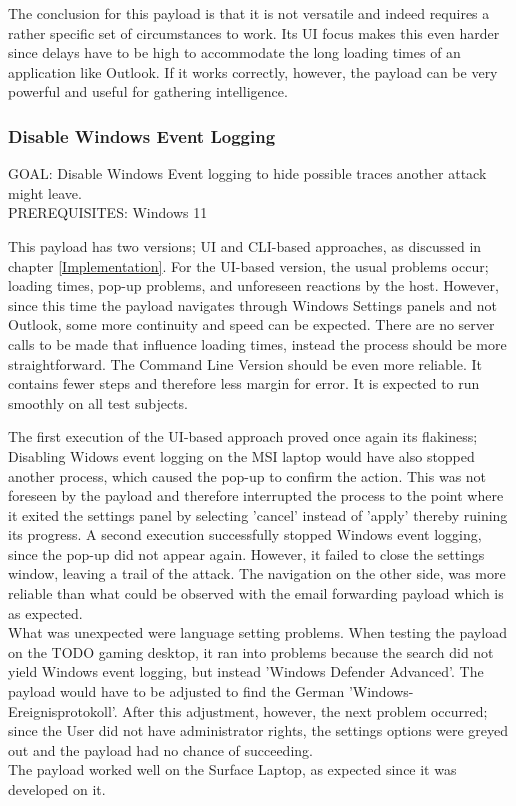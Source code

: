 The conclusion for this payload is that it is not versatile and indeed requires a rather specific set of circumstances to work. Its UI focus makes this even harder since delays have to be high to accommodate the long loading times of an application like Outlook. If it works correctly, however, the payload can be very powerful and useful for gathering intelligence. 


\subsubsection{Disable Windows Event Logging}

GOAL: Disable Windows Event logging to hide possible traces another attack might leave. \\
PREREQUISITES: Windows 11

This payload has two versions; UI and CLI-based approaches, as discussed in chapter \ref{Implementation}. For the UI-based version, the usual problems occur; loading times, pop-up problems, and unforeseen reactions by the host. However, since this time the payload navigates through Windows Settings panels and not Outlook, some more continuity and speed can be expected. There are no server calls to be made that influence loading times, instead the process should be more straightforward. 
The Command Line Version should be even more reliable. It contains fewer steps and therefore less margin for error. It is expected to run smoothly on all test subjects.

The first execution of the UI-based approach proved once again its flakiness; Disabling Widows event logging on the MSI laptop would have also stopped another process, which caused the pop-up to confirm the action. This was not foreseen by the payload and therefore interrupted the process to the point where it exited the settings panel by selecting 'cancel' instead of 'apply' thereby ruining its progress. A second execution successfully stopped Windows event logging, since the pop-up did not appear again. However, it failed to close the settings window, leaving a trail of the attack. The navigation on the other side, was more reliable than what could be observed with the email forwarding payload which is as expected. \\
What was unexpected were language setting problems. When testing the payload on the TODO gaming desktop, it ran into problems because the search did not yield Windows event logging, but instead 'Windows Defender Advanced'. The payload would have to be adjusted to find the German 'Windows-Ereignisprotokoll'. After this adjustment, however, the next problem occurred; since the User did not have administrator rights, the settings options were greyed out and the payload had no chance of succeeding. \\
The payload worked well on the Surface Laptop, as expected since it was developed on it.

